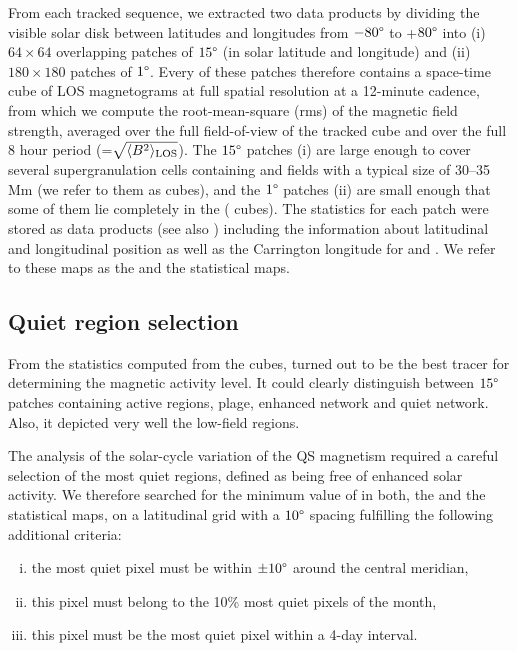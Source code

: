 \documentclass{aa}
\begin{document}
From each tracked sequence, we extracted two data products by dividing the visible solar disk  between latitudes and longitudes from $-80\degree$ to +$80\degree$ into (i) $64\times 64$  overlapping patches of $15\degree$ (in solar latitude and longitude)  and (ii) $180\times 180$ patches of $1\degree$.
Every of these patches therefore contains a space-time cube of LOS magnetograms at full spatial resolution at a 12-minute cadence,
from which we 
compute the 
root-mean-square
(rms) 
of the magnetic field strength, averaged over the full field-of-view of the tracked cube 
and over the full 8 hour period
(\brms{}=$\sqrt{\langle B^2\rangle_{\rm LOS}}$).
The $15\degree$ patches (i) are large enough to cover several supergranulation cells containing \NW{} and \IN{} fields \cite[]{2010LRSP....7....2R} with a typical size of 30--35\,Mm (we refer to them as \nw{} cubes), and the $1\degree$ patches (ii) are small enough that some of them lie completely in the \IN{} (\inw{} cubes). 
The statistics for each patch were stored as data products (see also ) including the information about 
latitudinal and longitudinal position as well as the Carrington 
longitude for \NW{} and \IN{}. We refer to these maps as the \nw{} and the \inw{} statistical maps.

\subsection{Quiet region selection\label{quietregion}}

From the 
statistics computed from the cubes, 
\brms{}
turned out to be the best tracer for determining the magnetic activity level. It could clearly distinguish between $15\degree$ patches containing active regions, plage, enhanced network and quiet network. Also, it depicted very well the low-field \IN{} regions.

The analysis of the solar-cycle variation of the 
QS
magnetism required a careful selection of the most quiet regions, defined as being free of enhanced solar activity. We therefore searched for the minimum value of \brms{} in both, the \nw{} and the \inw{} statistical maps, on a latitudinal grid with a $10\degree$ spacing fulfilling the following additional criteria:
\begin{enumerate}[(i)]
	\item\label{c1} the most quiet pixel must be within $\pm10\degree$ around the central meridian,
	\item\label{c2}  this pixel must belong to the 10\% most quiet pixels of the month,
	\item\label{c3}  this pixel must be the most quiet pixel within a 4-day interval.
\end{enumerate}
\end{document}
